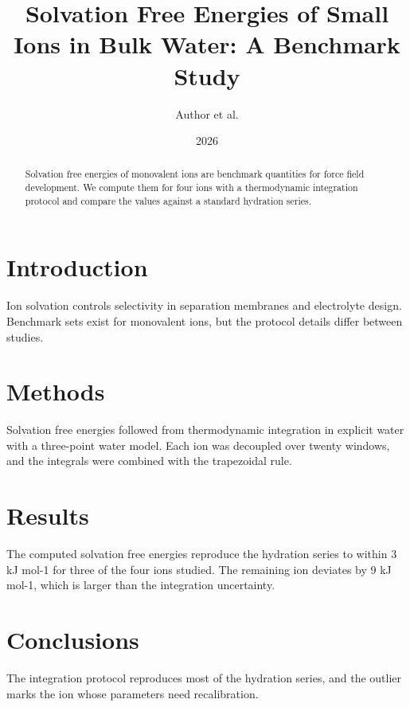 \documentclass[12pt]{article}
\title{Solvation Free Energies of Small Ions in Bulk Water: A Benchmark Study}
\author{Author et al.}
\date{2026}
\begin{document}
\maketitle

\begin{abstract}
Solvation free energies of monovalent ions are benchmark quantities for force field
development. We compute them for four ions with a thermodynamic integration protocol and
compare the values against a standard hydration series.
\end{abstract}

\section{Introduction}

Ion solvation controls selectivity in separation membranes and electrolyte design. Benchmark
sets exist for monovalent ions, but the protocol details differ between studies.

\section{Methods}

Solvation free energies followed from thermodynamic integration in explicit water with a
three-point water model. Each ion was decoupled over twenty windows, and the integrals were
combined with the trapezoidal rule.

\section{Results}

The computed solvation free energies reproduce the hydration series to within 3 kJ mol-1 for
three of the four ions studied. The remaining ion deviates by 9 kJ mol-1, which is larger than
the integration uncertainty.

\section{Conclusions}

The integration protocol reproduces most of the hydration series, and the outlier marks the
ion whose parameters need recalibration.
\end{document}

